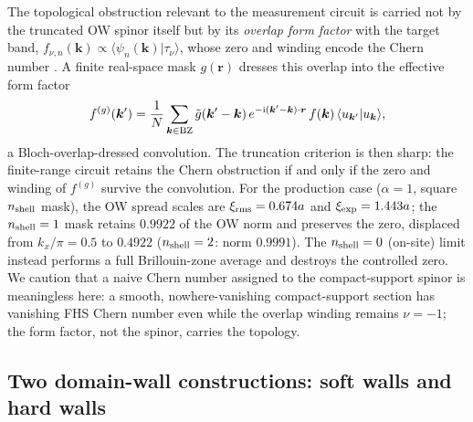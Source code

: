 \documentclass[aps,prl,onecolumn,superscriptaddress,nofootinbib]{revtex4-2}
\newcommand{\nsh}{n_{\rm shell}}
\newcommand{\braket}[2]{\langle#1|#2\rangle}
\begin{document}
The topological obstruction relevant to the measurement circuit is carried not by the truncated OW spinor itself but by its \emph{overlap form factor} with the target band, $f_{\nu,n}(\bm k)\propto\langle\psi_n(\bm k)|\tau_\nu\rangle$, whose zero and winding encode the Chern number \cite{BhuiyanPanJian2026}.  A finite real-space mask $g(\bm r)$ dresses this overlap into the effective form factor
\begin{equation}
  f^{(g)}(\bm k')=\frac{1}{N}\sum_{\bm k\in{\rm BZ}}
  \tilde g(\bm k'-\bm k)\,e^{-\mathrm{i}(\bm k'-\bm k)\cdot\bm r}\,
  f(\bm k)\,\braket{u_{\bm k'}}{u_{\bm k}},
  \label{eq:sm-formfactor}
\end{equation}
a Bloch-overlap-dressed convolution.  The truncation criterion is then sharp: the finite-range circuit retains the Chern obstruction if and only if the zero and winding of $f^{(g)}$ survive the convolution.  For the production case ($\alpha=1$, square $\nsh$ mask), the OW spread scales are $\xi_{\rm rms}=0.674a$ and $\xi_{\rm exp}=1.443a$; the $\nsh=1$ mask retains $0.9922$ of the OW norm and preserves the zero, displaced from $k_x/\pi=0.5$ to $0.4922$ ($\nsh=2$: norm $0.9991$).  The $\nsh=0$ (on-site) limit instead performs a full Brillouin-zone average and destroys the controlled zero.  We caution that a naive Chern number assigned to the compact-support spinor is meaningless here: a smooth, nowhere-vanishing compact-support section has vanishing FHS Chern number even while the overlap winding remains $\nu=-1$; the form factor, not the spinor, carries the topology.

\subsection{Two domain-wall constructions: soft walls and hard walls}
\end{document}
